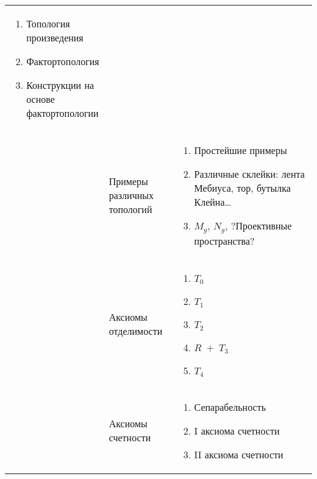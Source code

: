 \documentclass[a4paper,14pt]{extarticle}
\begin{document}
\begin{longtable}{|p{0.1\linewidth}|p{0.25\linewidth}|p{0.65\linewidth}|}
\begin{enumerate}
                                            \item Топология произведения
                                            \item Фактортопология
                                            \item Конструкции на основе фактортопологии
                                        \end{enumerate} \\
       \cline{2-3}
                               & Примеры различных топологий & 
                                        \begin{enumerate}
                                            \item Простейшие примеры
                                            \item Различные склейки: лента Мебиуса, тор, бутылка Клейна\dots
                                            \item $M_g$, $N_g$, ?Проективные пространства?
                                        \end{enumerate}
                                        \\
       \cline{2-3}
                               & Аксиомы отделимости &
                                        \begin{enumerate}
                                            \item $T_0$
                                            \item  $T_1$
                                            \item $T_2$
                                            \item $R\; + \; T_3$ 
                                            \item $T_4$ 
                                        \end{enumerate} 
                                        \\
      \cline{2-3}
                               & Аксиомы счетности & 
                                        \begin{enumerate}
                                            \item Сепарабельность
                                            \item I аксиома счетности
                                            \item II аксиома счетности
                                        \end{enumerate}

\end{longtable}
\end{document}
